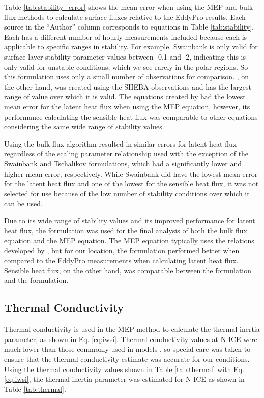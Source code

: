 Table \ref{tab:stability_error} shows the mean error when using the MEP and bulk flux methods to calculate surface fluxes relative to the EddyPro results. Each source in the ``Author'' column corresponds to equations in Table \ref{tab:stability}. Each has a different number of hourly measurements included because each is applicable to specific ranges in stability. For example. Swainbank \citep{foken:2008} is only valid for surface-layer stability parameter values between -0.1 and -2, indicating this is only valid for unstable conditions, which we see rarely in the polar regions. So this formulation uses only a small number of observations for comparison. \citet{andreas:311}, on the other hand, was created using the SHEBA observations and has the largest range of value over which it is valid. The equations created by \citet{andreas:311} had the lowest mean error for the latent heat flux when using the MEP equation, however, its performance calculating the sensible heat flux was comparable to other equations considering the same wide range of stability values. 

Using the bulk flux algorithm resulted in similar errors for latent heat flux regardless of the scaling parameter relationship used with the exception of the Swainbank and Tschalikov \citep{foken:2008} formulations, which had a significantly lower and higher mean error, respectively. While Swainbank \citep{foken:2008} did have the lowest mean error for the latent heat flux and one of the lowest for the sensible heat flux, it was not selected for use because of the low number of stability conditions over which it can be used.  

Due to its wide range of stability values and its improved performance for latent heat flux, the \citet{andreas:2010} formulation was used for the final analysis of both the bulk flux equation and the MEP equation. The MEP equation typically uses the relations developed by \citet{businger:1971}, but for our location, the \citet{andreas:311} formulation performed better when compared to the EddyPro measurements when calculating latent heat flux. Sensible heat flux, on the other hand, was comparable between the \citet{andreas:311} formulation and the \citet{businger:1971} formulation. 

\subsection{Thermal Conductivity}
Thermal conductivity is used in the MEP method to calculate the thermal inertia parameter, as shown in Eq. \ref{eq:iwsi}. Thermal conductivity values at N-ICE were much lower than those commonly used in models \citep{merkouriadi:2017}, so special care was taken to ensure that the thermal conductivity estimate was accurate for our conditions. Using the thermal conductivity values shown in Table \ref{tab:thermal} with Eq. \ref{eq:iwsi}, the thermal inertia parameter was estimated for N-ICE as shown in Table \ref{tab:thermal}. 

